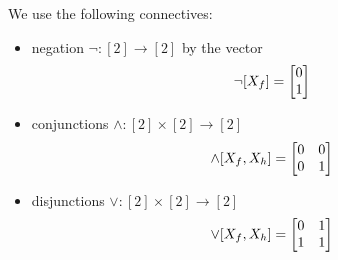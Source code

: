 \begin{example}\label{exa:connectives}
	We use the following connectives:
	\begin{itemize}
	\item negation $\lnot: [2]\rightarrow [2]$ by the vector
	\begin{align}
		{\lnot}[X_{f}] = \begin{bmatrix}
		0  \\
		1  
		\end{bmatrix} 
	\end{align}
	\item conjunctions $\land:  [2]\times[2] \rightarrow[2]$
		\begin{align}
			\land[X_{f},X_{h}]
			 = \begin{bmatrix}
			0 & 0 \\
			0 & 1 
			\end{bmatrix}
		\end{align}
	\item disjunctions $\lor : [2]\times[2] \rightarrow[2]$
		\begin{align}
			\lor[X_{f},X_{h}]
			 = \begin{bmatrix}
			0 & 1 \\
			1 & 1 

\end{bmatrix}
\end{align}
\end{itemize}
\end{example}
